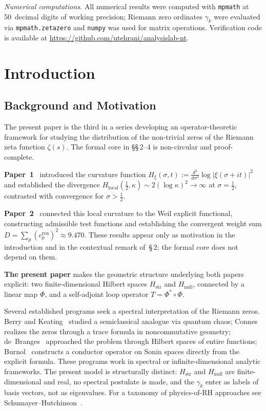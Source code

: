 \documentclass[11pt]{article}
\newcommand{\Hstr}{H_{\mathrm{str}}}
\newcommand{\Hnull}{H_{\mathrm{null}}}
\newcommand{\Hlocal}{H_{\mathrm{local}}}
\begin{document}
\medskip
\emph{Numerical computations.}
All numerical results were computed with \texttt{mpmath} at 50~decimal digits
of working precision; Riemann zero ordinates $\gamma_k$ were evaluated via
\texttt{mpmath.zetazero} and \texttt{numpy} was used for matrix operations.
Verification code is available at
\url{https://github.com/utehrani/analysislab-nt}.

\newpage

\section{Introduction}

\subsection{Background and Motivation}

The present paper is the third in a series developing an
operator-theoretic framework for studying the distribution of the
non-trivial zeros of the Riemann zeta function $\zeta(s)$.
The formal core in \S\S\,2--4 is non-circular and proof-complete.

\textbf{Paper~1}~\cite{Paper1} introduced the curvature function
$H_{\xi}(\sigma,t) := \frac{d^2}{d\sigma^2}\log|\xi(\sigma+it)|^2$
and established the divergence
$\Hlocal(\tfrac12,\kappa)\sim 2(\log\kappa)^2\to\infty$ at
$\sigma=\tfrac12$, contrasted with convergence for $\sigma>\tfrac12$.

\textbf{Paper~2}~\cite{Paper2} connected this local curvature to the
Weil explicit functional, constructing admissible test functions
and establishing the convergent weight sum
$D=\sum_p(c_p^{\mathrm{ren}})^2\approx 9.470$.
These results appear only as motivation in the introduction and in the
contextual remark of~\S\,2; the formal core does not depend on them.

\textbf{The present paper} makes the geometric structure underlying
both papers explicit: two finite-dimensional Hilbert spaces $\Hstr$
and $\Hnull$, connected by a linear map $\Phi$, and a self-adjoint
loop operator $T=\Phi^*\circ\Phi$.

Several established programs seek a spectral interpretation of the
Riemann zeros. Berry and Keating~\cite{BerryKeating} studied a
semiclassical analogue via quantum chaos;
Connes~\cite{Connes} realizes the zeros through a trace formula in
noncommutative geometry;
de~Branges~\cite{deBranges} approached the problem through Hilbert
spaces of entire functions;
Burnol~\cite{BurnolForum04} constructs a conductor operator on
Sonin spaces directly from the explicit formula.
These programs work in spectral or infinite-dimensional analytic
frameworks. The present model is structurally distinct:
$H_{\mathrm{str}}$ and $H_{\mathrm{null}}$ are finite-dimensional
and real, no spectral postulate is made, and the $\gamma_k$ enter
as labels of basis vectors, not as eigenvalues.
For a taxonomy of physics-of-RH approaches see
Schumayer--Hutchinson~\cite{SchumayerHutchinson11}.
\end{document}
